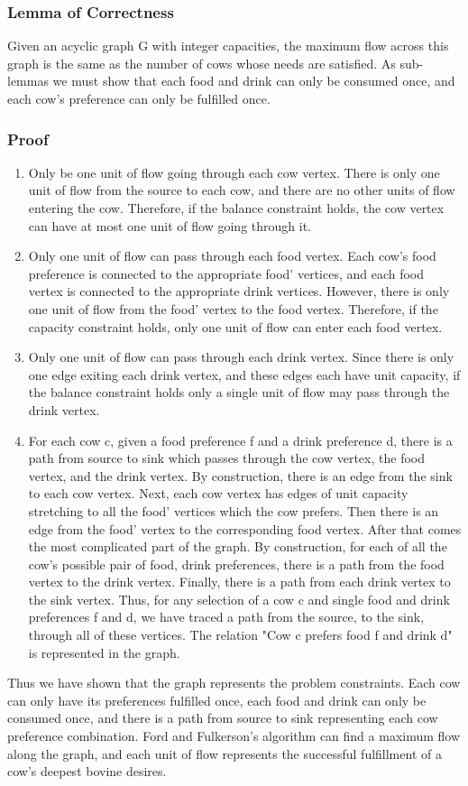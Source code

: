 \documentclass[12pt,letterpaper]{article}
\begin{document}
\subsubsection{Lemma of Correctness}
Given an acyclic graph G with integer capacities, the maximum flow across this graph is the same as the number of cows whose needs are satisfied. As sub-lemmas we must show that each food and drink can only be consumed once, and each cow's preference can only be fulfilled once.


\subsubsection{Proof}
\begin{enumerate}
\item Only be one unit of flow going through each cow vertex. There is only one unit of flow from the source to each cow, and there are no other units of flow entering the cow. Therefore, if the balance constraint holds, the cow vertex can have at most one unit of flow going through it.
\item Only one unit of flow can pass through each food vertex. Each cow's food preference is connected to the appropriate food' vertices, and each food vertex is connected to the appropriate drink vertices. However, there is only one unit of flow from the food' vertex to the food vertex. Therefore, if the capacity constraint holds, only one unit of flow can enter each food vertex.
\item Only one unit of flow can pass through each drink vertex. Since there is only one edge exiting each drink vertex, and these edges each have unit capacity, if the balance constraint holds only a single unit of flow may pass through the drink vertex.
\item For each cow c, given a food preference f and a drink preference d, there is a path from source to sink which passes through the cow vertex, the food vertex, and the drink vertex. By construction, there is an edge from the sink to each cow vertex. Next, each cow vertex has edges of unit capacity stretching to all the food' vertices which the cow prefers. Then there is an edge from the food' vertex to the corresponding food vertex. After that comes the most complicated part of the graph. By construction, for each of all the cow's possible pair of food, drink preferences, there is a path from the food vertex to the drink vertex. Finally, there is a path from each drink vertex to the sink vertex. Thus, for any selection of a cow c and single food and drink preferences f and d, we have traced a path from the source, to the sink, through all of these vertices. The relation "Cow c prefers food f and drink d" is represented in the graph.
\end{enumerate}
Thus we have shown that the graph represents the problem constraints. Each cow can only have its preferences fulfilled once, each food and drink can only be consumed once, and there is a path from source to sink representing each cow preference combination. Ford and Fulkerson's algorithm can find a maximum flow along the graph, and each unit of flow represents the successful fulfillment of a cow's deepest bovine desires.
\end{document}
